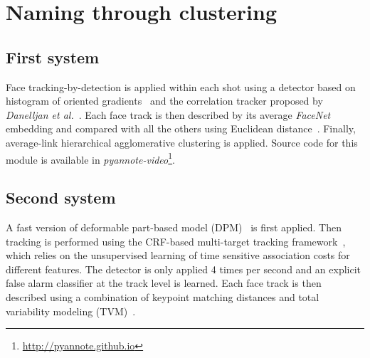 \section{Naming through clustering}
\label{sec:face_clustering}

\subsection{First system}

Face tracking-by-detection is applied within each shot using a detector based on histogram of oriented gradients~\cite{Dalal2005} and the correlation tracker proposed by \emph{Danelljan et al.}~\cite{Danelljan2014}. Each face track is then described by its average \emph{FaceNet} embedding and compared with all the others using Euclidean distance~\cite{Schroff2015}. Finally, average-link hierarchical agglomerative clustering is applied. Source code for this module is available in \emph{pyannote-video}\footnote{\url{http://pyannote.github.io}}.

\subsection{Second system}

A fast version of deformable part-based model (DPM)~\cite{felzenszwalb2010dpm,mathias2014face,dubout2013deformable} is first applied. Then tracking is performed using the CRF-based multi-target tracking framework~\cite{heili2014tracking}, which relies on the unsupervised learning of time sensitive association costs for different features.
%
The detector is only applied 4 times per second and an explicit false alarm classifier at the track level is learned\cite{Le_ICPR_2016}.
%
Each face track is then described using a combination of keypoint matching distances and total variability modeling (TVM)~\cite{wallace2011inter,wallace2012total,Khoury:ICMR:2013}.

\endinput
